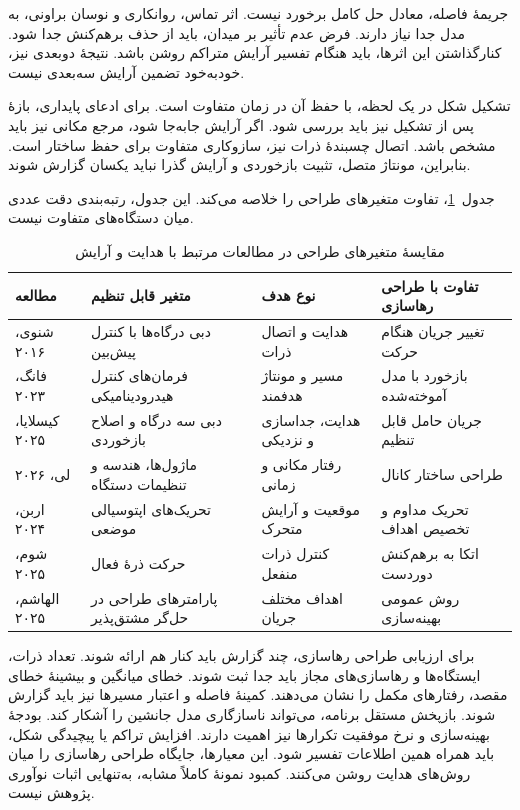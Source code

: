 جریمهٔ فاصله، معادل حل کامل برخورد نیست.
اثر تماس، روانکاری و نوسان براونی، به مدل جدا نیاز دارند.
فرض عدم تأثیر بر میدان، باید از حذف برهم‌کنش جدا شود.
کنارگذاشتن این اثرها، باید هنگام تفسیر آرایش متراکم روشن باشد.
نتیجهٔ دوبعدی نیز، خودبه‌خود تضمین آرایش سه‌بعدی نیست.

تشکیل شکل در یک لحظه، با حفظ آن در زمان متفاوت است.
برای ادعای پایداری، بازهٔ پس از تشکیل نیز باید بررسی شود.
اگر آرایش جابه‌جا شود، مرجع مکانی نیز باید مشخص باشد.
اتصال چسبندهٔ ذرات نیز، سازوکاری متفاوت برای حفظ ساختار است.
بنابراین، مونتاژ متصل، تثبیت بازخوردی و آرایش گذرا نباید یکسان گزارش شوند.

جدول~\ref{tab:lit-formation-design-comparison}، تفاوت متغیرهای طراحی را خلاصه می‌کند.
این جدول، رتبه‌بندی دقت عددی میان دستگاه‌های متفاوت نیست.

\begin{table}[htbp]
\centering
\caption{مقایسهٔ متغیرهای طراحی در مطالعات مرتبط با هدایت و آرایش}
\label{tab:lit-formation-design-comparison}
\begin{tabular}{p{}p{}p{}p{}}
\hline
مطالعه & متغیر قابل تنظیم & نوع هدف & تفاوت با طراحی رهاسازی \\
\hline
شنوی، ۲۰۱۶ & دبی درگاه‌ها با کنترل پیش‌بین & هدایت و اتصال ذرات & تغییر جریان هنگام حرکت \\
فانگ، ۲۰۲۳ & فرمان‌های کنترل هیدرودینامیکی & مسیر و مونتاژ هدفمند & بازخورد با مدل آموخته‌شده \\
کیسلایا، ۲۰۲۵ & دبی سه درگاه و اصلاح بازخوردی & هدایت، جداسازی و نزدیکی & جریان حامل قابل تنظیم \\
لی، ۲۰۲۶ & ماژول‌ها، هندسه و تنظیمات دستگاه & رفتار مکانی و زمانی & طراحی ساختار کانال \\
اربن، ۲۰۲۴ & تحریک‌های اپتوسیالی موضعی & موقعیت و آرایش متحرک & تحریک مداوم و تخصیص اهداف \\
شوم، ۲۰۲۵ & حرکت ذرهٔ فعال & کنترل ذرات منفعل & اتکا به برهم‌کنش دوردست \\
الهاشم، ۲۰۲۵ & پارامترهای طراحی در حل‌گر مشتق‌پذیر & اهداف مختلف جریان & روش عمومی بهینه‌سازی \\
\hline
\end{tabular}
\end{table}

برای ارزیابی طراحی رهاسازی، چند گزارش باید کنار هم ارائه شوند.
تعداد ذرات، ایستگاه‌ها و رهاسازی‌های مجاز باید جدا ثبت شوند.
خطای میانگین و بیشینهٔ خطای مقصد، رفتارهای مکمل را نشان می‌دهند.
کمینهٔ فاصله و اعتبار مسیرها نیز باید گزارش شوند.
بازپخش مستقل برنامه، می‌تواند ناسازگاری مدل جانشین را آشکار کند.
بودجهٔ بهینه‌سازی و نرخ موفقیت تکرارها نیز اهمیت دارند.
افزایش تراکم یا پیچیدگی شکل، باید همراه همین اطلاعات تفسیر شود.
این معیارها، جایگاه طراحی رهاسازی را میان روش‌های هدایت روشن می‌کنند.
کمبود نمونهٔ کاملاً مشابه، به‌تنهایی اثبات نوآوری پژوهش نیست.

